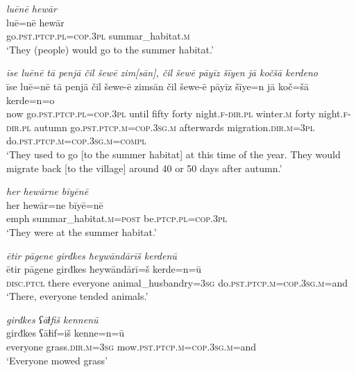 \ea \label{ŽE.8}
\textit{luēnē hewār} \\ 
\gll luē=nē hewār \\ 
 go\textsc{.pst}\textsc{.ptcp}\textsc{.pl}\textsc{=cop}\textsc{.3pl} summar\_habitat\textsc{.m} \\ 
\glt `They (people) would go to the summer habitat.'
\z 
 
\ea \label{ŽE.9}
\textit{īse luēnē tā penjā čil šewē zim[sān], čil šewē pāyīz šīyen jā kočšā kerdeno} \\ 
\gll īse luē=nē tā penjā čil šewe-ē zimsān čil šewe-ē pāyīz šīye=n jā koč=šā kerde=n=o \\ 
 now go\textsc{.pst}\textsc{.ptcp}\textsc{.pl}\textsc{=cop}\textsc{.3pl} until fifty forty night\textsc{.f}\textsc{-dir}\textsc{.pl} winter\textsc{.m} forty night\textsc{.f}\textsc{-dir}\textsc{.pl} autumn go\textsc{.pst}\textsc{.ptcp}\textsc{.m}\textsc{=cop}\textsc{.3sg}\textsc{.m} afterwards migration\textsc{.dir}\textsc{.m}\textsc{=3pl} do\textsc{.pst}\textsc{.ptcp}\textsc{.m}\textsc{=cop}\textsc{.3sg}\textsc{.m}\textsc{=compl} \\ 
\glt `They used to go [to the summer habitat] at this time of the year. They would migrate back [to the village] around 40 or 50 days after autumn.'
\z 
 
\ea \label{ŽE.10}
\textit{her hewārne bīyēnē} \\ 
\gll her hewār=ne bīyē=nē \\ 
 emph summar\_habitat\textsc{.m}\textsc{=\textsc{post}} be\textsc{.ptcp}\textsc{.pl}\textsc{=cop}\textsc{.3pl} \\ 
\glt `They were at the summer habitat.'
\z 
 
\ea \label{ŽE.11}
\textit{ētir pāgene girđkes ħeywāndārīš kerdenū} \\ 
\gll ētir pāgene girđkes ħeywāndārī=š kerde=n=ū \\ 
 \textsc{disc.ptcl} there everyone animal\_husbandry\textsc{=3sg} do\textsc{.pst}\textsc{.ptcp}\textsc{.m}\textsc{=cop}\textsc{.3sg}\textsc{.m}=and \\ 
\glt `There, everyone tended animals.'
\z 
 
\ea \label{ŽE.12}
\textit{girđkes ʕāɫfiš kennenū} \\ 
\gll girđkes ʕāɫif=iš kenne=n=ū \\ 
 everyone grass\textsc{.dir}\textsc{.m}\textsc{=3sg} mow\textsc{.pst}\textsc{.ptcp}\textsc{.m}\textsc{=cop}\textsc{.3sg}\textsc{.m}=and \\ 
\glt `Everyone mowed grass'
\z 
 
